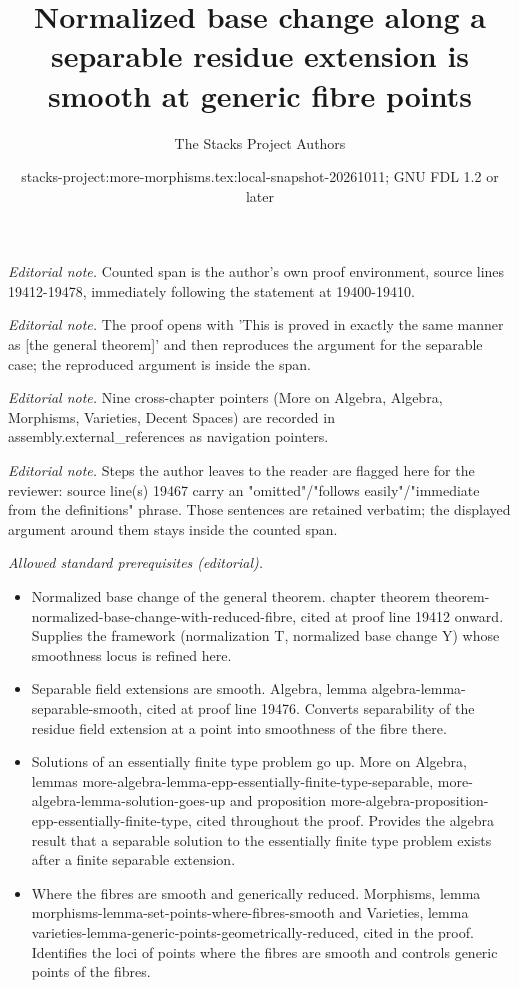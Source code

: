 \documentclass[10pt,a4paper]{amsart}
\title{Normalized base change along a separable residue extension is smooth at generic fibre points}
\author{The Stacks Project Authors}
\date{stacks-project:more-morphisms.tex:local-snapshot-20261011; GNU FDL 1.2 or later}
\theoremstyle{plain}
\theoremstyle{definition}
\theoremstyle{remark}
\numberwithin{equation}{subsection}
\begin{document}
\maketitle
\noindent\textit{Editorial note.} Counted span is the author's own proof environment, source lines 19412-19478, immediately following the statement at 19400-19410.\par\medskip
\noindent\textit{Editorial note.} The proof opens with 'This is proved in exactly the same manner as [the general theorem]' and then reproduces the argument for the separable case; the reproduced argument is inside the span.\par\medskip
\noindent\textit{Editorial note.} Nine cross-chapter pointers (More on Algebra, Algebra, Morphisms, Varieties, Decent Spaces) are recorded in assembly.external\_references as navigation pointers.\par\medskip
\noindent\textit{Editorial note.} Steps the author leaves to the reader are flagged here for the reviewer: source line(s) 19467 carry an "omitted"/"follows easily"/"immediate from the definitions" phrase. Those sentences are retained verbatim; the displayed argument around them stays inside the counted span.\par\medskip
\noindent\textit{Allowed standard prerequisites (editorial).}\begin{itemize}
\item Normalized base change of the general theorem. chapter theorem theorem-normalized-base-change-with-reduced-fibre, cited at proof line 19412 onward. Supplies the framework (normalization T, normalized base change Y) whose smoothness locus is refined here.
\item Separable field extensions are smooth. Algebra, lemma algebra-lemma-separable-smooth, cited at proof line 19476. Converts separability of the residue field extension at a point into smoothness of the fibre there.
\item Solutions of an essentially finite type problem go up. More on Algebra, lemmas more-algebra-lemma-epp-essentially-finite-type-separable, more-algebra-lemma-solution-goes-up and proposition more-algebra-proposition-epp-essentially-finite-type, cited throughout the proof. Provides the algebra result that a separable solution to the essentially finite type problem exists after a finite separable extension.
\item Where the fibres are smooth and generically reduced. Morphisms, lemma morphisms-lemma-set-points-where-fibres-smooth and Varieties, lemma varieties-lemma-generic-points-geometrically-reduced, cited in the proof. Identifies the loci of points where the fibres are smooth and controls generic points of the fibres.
\end{itemize}\medskip
\end{document}
